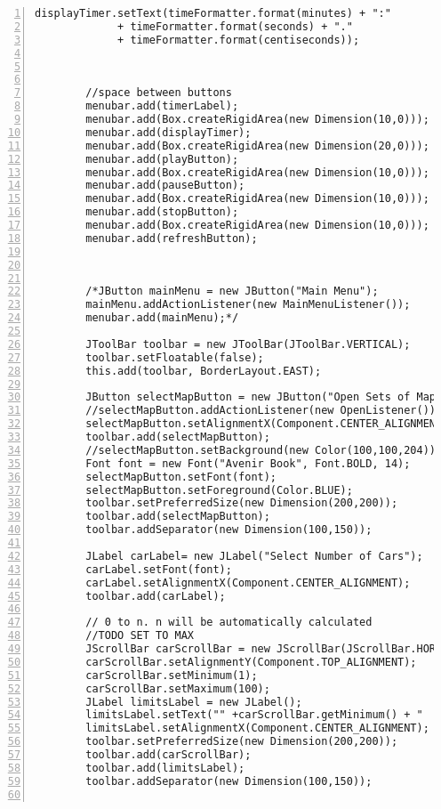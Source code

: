 \begin{lstlisting}[numbers=left, numberstyle=\small, numbersep=8pt,  framexleftmargin=1pt, framexrightmargin=10pt ]
	displayTimer.setText(timeFormatter.format(minutes) + ":"
             + timeFormatter.format(seconds) + "."
             + timeFormatter.format(centiseconds));

	
		
		//space between buttons
		menubar.add(timerLabel);
		menubar.add(Box.createRigidArea(new Dimension(10,0)));
		menubar.add(displayTimer);
		menubar.add(Box.createRigidArea(new Dimension(20,0)));
		menubar.add(playButton);
		menubar.add(Box.createRigidArea(new Dimension(10,0)));
		menubar.add(pauseButton); 
		menubar.add(Box.createRigidArea(new Dimension(10,0)));
		menubar.add(stopButton);
		menubar.add(Box.createRigidArea(new Dimension(10,0)));
		menubar.add(refreshButton);  
		
		
	
		/*JButton mainMenu = new JButton("Main Menu");
		mainMenu.addActionListener(new MainMenuListener());
		menubar.add(mainMenu);*/
		
		JToolBar toolbar = new JToolBar(JToolBar.VERTICAL);
		toolbar.setFloatable(false);
		this.add(toolbar, BorderLayout.EAST);
		
		JButton selectMapButton = new JButton("Open Sets of Maps");
		//selectMapButton.addActionListener(new OpenListener());
		selectMapButton.setAlignmentX(Component.CENTER_ALIGNMENT);
		toolbar.add(selectMapButton);
		//selectMapButton.setBackground(new Color(100,100,204));
		Font font = new Font("Avenir Book", Font.BOLD, 14);
		selectMapButton.setFont(font);
		selectMapButton.setForeground(Color.BLUE);
		toolbar.setPreferredSize(new Dimension(200,200));
		toolbar.add(selectMapButton);
		toolbar.addSeparator(new Dimension(100,150));
		
		JLabel carLabel= new JLabel("Select Number of Cars");
		carLabel.setFont(font);
		carLabel.setAlignmentX(Component.CENTER_ALIGNMENT);
		toolbar.add(carLabel);
		
		// 0 to n. n will be automatically calculated
		//TODO SET TO MAX
		JScrollBar carScrollBar = new JScrollBar(JScrollBar.HORIZONTAL, 1, 10, 0, 100); 
		carScrollBar.setAlignmentY(Component.TOP_ALIGNMENT);
		carScrollBar.setMinimum(1);
		carScrollBar.setMaximum(100);
		JLabel limitsLabel = new JLabel();
		limitsLabel.setText("" +carScrollBar.getMinimum() + "                              " + carScrollBar.getMaximum());
		limitsLabel.setAlignmentX(Component.CENTER_ALIGNMENT);
		toolbar.setPreferredSize(new Dimension(200,200));
		toolbar.add(carScrollBar);
		toolbar.add(limitsLabel);
		toolbar.addSeparator(new Dimension(100,150));
	

\end{lstlisting}
